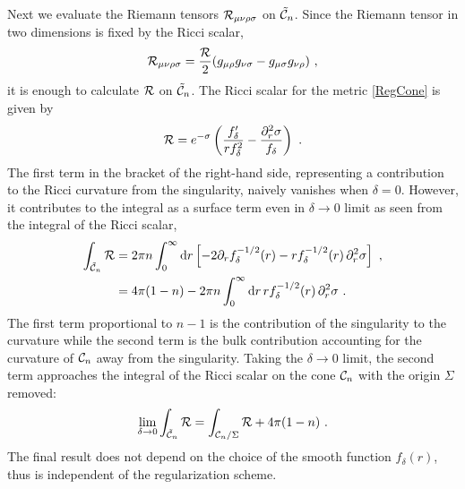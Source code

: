 Next we evaluate the Riemann tensors ${\cal R}_{\mu\nu\rho\sigma}$ on $\tilde {{\cal C}}_n$.
Since the Riemann tensor in two dimensions is fixed by the Ricci scalar,
\begin{align}
	{\cal R}_{\mu\nu\rho\sigma} = \frac{{\cal R}}{2}(g_{\mu\rho} g_{\nu\sigma} - g_{\mu\sigma} g_{\nu\rho}) \ ,
\end{align}
it is enough to calculate ${\cal R}$ on $\tilde {{\cal C}}_n$.
The Ricci scalar for the metric \eqref{RegCone} is given by
\begin{align}
	{\cal R} = e^{-\sigma} \left( \frac{f_\delta'}{r f_\delta^2} - \frac{\partial_r^2 \sigma}{f_\delta} \right) \ .
\end{align}
The first term in the bracket of the right-hand side, representing a contribution to the Ricci curvature from the singularity, naively vanishes when $\delta = 0$.
However, it contributes to the integral as a surface term even in $\delta \to 0$ limit as seen from the integral of the Ricci scalar,
\begin{align}
\begin{aligned}
\int_{\tilde{{\cal C}}_n} {\cal R} &= 2\pi n\int_0^\infty \mathrm{d} r \left[ -2 \partial_r f^{-1/2}_\delta(r) - r f_\delta^{-1/2}(r) \, \partial_r^2 \sigma \right] \ ,\\
	&= 4\pi (1-n) - 2\pi n \int_0^\infty \mathrm{d} r \,r f_\delta^{-1/2}(r) \, \partial_r^2 \sigma \ .
\end{aligned}
\end{align}
The first term proportional to $n-1$ is the contribution of the singularity to the curvature
while the second term is the bulk contribution accounting for the curvature of ${\cal C}_n$ away from the singularity.
Taking the $\delta \to 0$ limit, the second term approaches the integral of the Ricci scalar on the cone ${\cal C}_n$ with the origin $\Sigma$ removed:
\begin{align}
	\lim_{\delta \to 0} \int_{\tilde{{\cal C}}_n}  {\cal R} = \int_{{\cal C}_n/\Sigma} {\cal R} + 4\pi (1-n)\ .
\end{align}
The final result does not depend on the choice of the smooth function $f_\delta(r)$, thus is independent of the regularization scheme.

